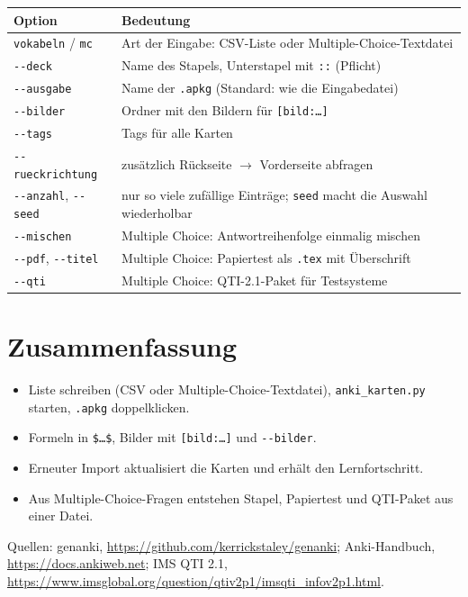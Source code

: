 \begin{center}
\begin{tabular}{@{}l>{\raggedright\arraybackslash}p{11cm}@{}}
	\toprule
	\textbf{Option} & \textbf{Bedeutung} \\
	\midrule
	\texttt{vokabeln} / \texttt{mc} & Art der Eingabe: CSV-Liste oder Multiple-Choice-Textdatei \\
	\texttt{-{}-deck} & Name des Stapels, Unterstapel mit \texttt{::} (Pflicht) \\
	\texttt{-{}-ausgabe} & Name der \texttt{.apkg} (Standard: wie die Eingabedatei) \\
	\texttt{-{}-bilder} & Ordner mit den Bildern für \texttt{[bild:\dots]} \\
	\texttt{-{}-tags} & Tags für alle Karten \\
	\texttt{-{}-rueckrichtung} & zusätzlich Rückseite $\to$ Vorderseite abfragen \\
	\texttt{-{}-anzahl}, \texttt{-{}-seed} & nur so viele zufällige Einträge; \texttt{seed} macht die Auswahl wiederholbar \\
	\texttt{-{}-mischen} & Multiple Choice: Antwortreihenfolge einmalig mischen \\
	\texttt{-{}-pdf}, \texttt{-{}-titel} & Multiple Choice: Papiertest als \texttt{.tex} mit Überschrift \\
	\texttt{-{}-qti} & Multiple Choice: QTI-2.1-Paket für Testsysteme \\
	\bottomrule
\end{tabular}
\end{center}



\section{Zusammenfassung}

\begin{itemize}
	\item Liste schreiben (CSV oder Multiple-Choice-Textdatei), \texttt{anki\_karten.py} starten, \texttt{.apkg} doppelklicken.
	\item Formeln in \texttt{\$\dots\$}, Bilder mit \texttt{[bild:\dots]} und \texttt{-{}-bilder}.
	\item Erneuter Import aktualisiert die Karten und erhält den Lernfortschritt.
	\item Aus Multiple-Choice-Fragen entstehen Stapel, Papiertest und QTI-Paket aus einer Datei.
\end{itemize}

Quellen: genanki, \url{https://github.com/kerrickstaley/genanki}; Anki-Handbuch, \url{https://docs.ankiweb.net}; IMS QTI 2.1, \url{https://www.imsglobal.org/question/qtiv2p1/imsqti_infov2p1.html}.


